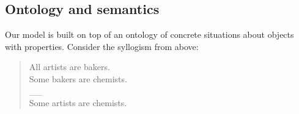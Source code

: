 \documentclass[floatsintext, doc]{apa6}
\newcommand{\mht}[1]{{\textcolor{Blue}{[mht: #1]}}}
\begin{document}
%



\subsection{Ontology and semantics}

Our model is built on top of an ontology of concrete situations about objects with properties. 
Consider the syllogism from above:

\begin{quote}
All artists are bakers. \\
Some bakers are chemists. \\
\_\_ \\
Some artists are chemists.
\end{quote}
\end{document}
